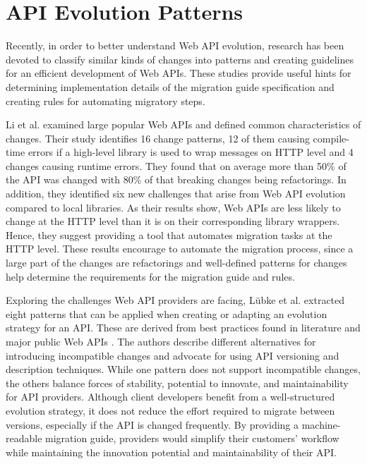 \section{API Evolution Patterns}
\label{sec:APIEvolutionPatterns}

Recently, in order to better understand Web API evolution, research has been devoted to classify similar kinds of changes into patterns and creating guidelines for an efficient development of Web APIs. These studies provide useful hints for determining implementation details of the migration guide specification and creating rules for automating migratory steps.

Li et al. \cite{li_how_2013} examined large popular Web APIs and defined common characteristics of changes. Their study identifies 16 change patterns, 12 of them causing compile-time errors if a high-level library is used to wrap messages on HTTP level and 4 changes causing runtime errors. They found that on average more than 50\% of the API was changed with 80\% of that breaking changes being refactorings. In addition, they identified six new challenges that arise from Web API evolution compared to local libraries. As their results show, Web APIs are less likely to change at the HTTP level than it is on their corresponding library wrappers. Hence, they suggest providing a tool that automates migration tasks at the HTTP level. These results encourage to automate the migration process, since a large part of the changes are refactorings and well-defined patterns for changes help determine the requirements for the migration guide and rules.

Exploring the challenges Web API providers are facing, Lübke et al. \cite{lubke_interface_2019} extracted eight patterns that can be applied when creating or adapting an evolution strategy for an API. These are derived from best practices found in literature and major public Web APIs \cite{lubke_interface_2019}. The authors describe different alternatives for introducing incompatible changes and advocate for using API versioning and description techniques. While one pattern does not support incompatible changes, the others balance forces of stability, potential to innovate, and maintainability for API providers. Although client developers benefit from a well-structured evolution strategy, it does not reduce the effort required to migrate between versions, especially if the API is changed frequently. By providing a machine-readable migration guide, providers would simplify their customers' workflow while maintaining the innovation potential and maintainability of their API.